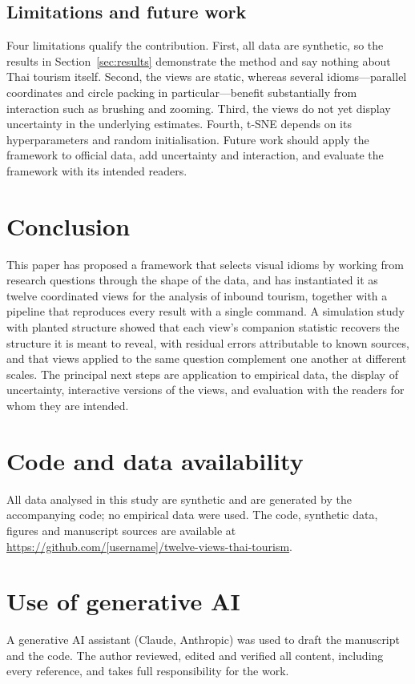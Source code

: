\documentclass{article}
\begin{document}
\subsection{Limitations and future work}
Four limitations qualify the contribution. First, all data are synthetic, so the results in
Section~\ref{sec:results} demonstrate the method and say nothing about Thai tourism itself. Second, the views
are static, whereas several idioms---parallel coordinates and circle packing in particular---benefit
substantially from interaction such as brushing and zooming. Third, the views do not yet display uncertainty
in the underlying estimates. Fourth, t-SNE depends on its hyperparameters and random initialisation. Future
work should apply the framework to official data, add uncertainty and interaction, and evaluate the framework
with its intended readers.

\section{Conclusion}\label{sec:conclusion}

This paper has proposed a framework that selects visual idioms by working from research questions through the
shape of the data, and has instantiated it as twelve coordinated views for the analysis of inbound tourism,
together with a pipeline that reproduces every result with a single command. A simulation study with planted
structure showed that each view's companion statistic recovers the structure it is meant to reveal, with
residual errors attributable to known sources, and that views applied to the same question complement one
another at different scales. The principal next steps are application to empirical data, the display of
uncertainty, interactive versions of the views, and evaluation with the readers for whom they are intended.

\section*{Code and data availability}
All data analysed in this study are synthetic and are generated by the accompanying code; no empirical data
were used. The code, synthetic data, figures and manuscript sources are available at
\url{https://github.com/[username]/twelve-views-thai-tourism}.

\section*{Use of generative AI}
A generative AI assistant (Claude, Anthropic) was used to draft the manuscript and the code. The author
reviewed, edited and verified all content, including every reference, and takes full responsibility for
the work.
\end{document}
